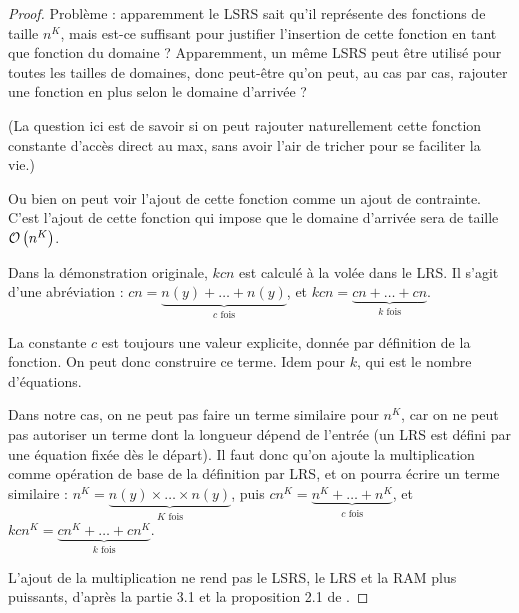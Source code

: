 \documentclass{article}
\begin{document}
\begin{proof}
{\begin{minipage}{0.9\textwidth}
{\begin{minipage}{0.95\textwidth}
						Problème : apparemment le LSRS sait qu'il représente des fonctions de taille $n^K$, mais est-ce suffisant pour justifier l'insertion de cette fonction en tant que fonction du domaine ? Apparemment, un même LSRS peut être utilisé pour toutes les tailles de domaines, donc peut-être qu'on peut, au cas par cas, rajouter une fonction en plus selon le domaine d'arrivée ?
						
						(La question ici est de savoir si on peut rajouter naturellement cette fonction constante d'accès direct au max, sans avoir l'air de tricher pour se faciliter la vie.)
						
						Ou bien on peut voir l'ajout de cette fonction comme un ajout de contrainte. C'est l'ajout de cette fonction qui impose que le domaine d'arrivée sera de taille $\mathcal{O}\left( n^K \right)$.
					\end{minipage} }
				
					
					Dans la démonstration originale, $kcn$ est calculé à la volée dans le LRS. Il s'agit d'une abréviation : $cn = \underset{c \text{ fois}}{\underbrace{n(y) + \dots + n(y)}}$, et $kcn = \underset{k \text{ fois}}{\underbrace{cn + \dots + cn}}$. 
					
					La constante $c$ est toujours une valeur explicite, donnée par définition de la fonction. On peut donc construire ce terme. Idem pour $k$, qui est le nombre d'équations. 
					
					Dans notre cas, on ne peut pas faire un terme similaire pour $n^K$, car on ne peut pas autoriser un terme dont la longueur dépend de l'entrée (un LRS est défini par une équation fixée dès le départ). Il faut donc qu'on ajoute la multiplication comme opération de base de la définition par LRS, et on pourra écrire un terme similaire : $n^K = \underset{K \text{ fois}}{\underbrace{n(y) \times \dots \times n(y)}}$, puis $cn^K = \underset{c \text{ fois}}{\underbrace{n^K + \dots + n^K}}$, et $kcn^K = \underset{k \text{ fois}}{\underbrace{cn^K + \dots + cn^K}}$. 
					
					L'ajout de la multiplication ne rend pas le LSRS, le LRS et la RAM plus puissants, d'après la partie 3.1 et la proposition 2.1 de \cite{GrandjeanSchwentick2002}. 
					

\end{minipage}}
\end{proof}
\end{document}
